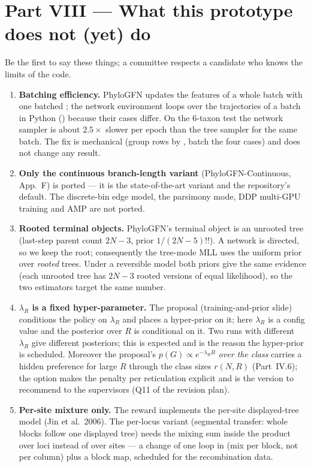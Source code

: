 \section{Part VIII --- What this prototype does not (yet) do}

Be the first to say these things; a committee respects a candidate who knows the limits of the code.

\begin{enumerate}[leftmargin=*]
\item \textbf{Batching efficiency.} PhyloGFN updates the features of a whole batch with one batched ; the network environment loops over the trajectories of a batch in Python () because their cases differ. On the 6-taxon test the network sampler is about $2.5\times$ slower per epoch than the tree sampler for the same batch. The fix is mechanical (group rows by , batch the four cases) and does not change any result.
\item \textbf{Only the continuous branch-length variant} (PhyloGFN-Continuous, App.~F) is ported --- it is the state-of-the-art variant and the repository's default. The discrete-bin edge model, the parsimony mode, DDP multi-GPU training and AMP are not ported.
\item \textbf{Rooted terminal objects.} PhyloGFN's terminal object is an unrooted tree (last-step parent count $2N-3$, prior $1/(2N-5)!!$). A network is directed, so we keep the root; consequently the tree-mode MLL uses the uniform prior over \emph{rooted} trees. Under a reversible model both priors give the same evidence (each unrooted tree has $2N-3$ rooted versions of equal likelihood), so the two estimators target the same number.
\item \textbf{$\lambda_R$ is a fixed hyper-parameter.} The proposal (training-and-prior slide) conditions the policy on $\lambda_R$ and places a hyper-prior on it; here $\lambda_R$ is a config value and the posterior over $R$ is conditional on it. Two runs with different $\lambda_R$ give different posteriors; this is expected and is the reason the hyper-prior is scheduled. Moreover the proposal's $p(G)\propto e^{-\lambda_RR}$ \emph{over the class} carries a hidden preference for large $R$ through the class sizes $r(N,R)$ (Part~IV.6); the  option makes the penalty per reticulation explicit and is the version to recommend to the supervisors (Q11 of the revision plan).
\item \textbf{Per-site mixture only.} The reward implements the per-site displayed-tree model (Jin et al.\ 2006). The per-locus variant (segmental transfer: whole blocks follow one displayed tree) needs the mixing sum inside the product over loci instead of over sites --- a change of one loop in  (mix per block, not per column) plus a block map, scheduled for the recombination data.

\end{enumerate}
